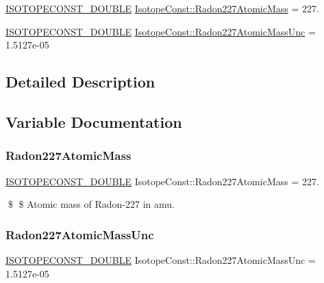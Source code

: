 \begin{DoxyCompactItemize}
\item 
\mbox{\hyperlink{group___isotope_const-_macros_ga8f45a7272ce02c0b4c65c44636ed719a}{I\+S\+O\+T\+O\+P\+E\+C\+O\+N\+S\+T\+\_\+\+D\+O\+U\+B\+LE}} \mbox{\hyperlink{group___isotope_const-_radon-_rn227_ga973813f99c9bd095d65d0279032d362c}{Isotope\+Const\+::\+Radon227\+Atomic\+Mass}} = 227.
\item 
\mbox{\hyperlink{group___isotope_const-_macros_ga8f45a7272ce02c0b4c65c44636ed719a}{I\+S\+O\+T\+O\+P\+E\+C\+O\+N\+S\+T\+\_\+\+D\+O\+U\+B\+LE}} \mbox{\hyperlink{group___isotope_const-_radon-_rn227_ga171e5f8f85390c8c693816c1dfc563f5}{Isotope\+Const\+::\+Radon227\+Atomic\+Mass\+Unc}} = 1.\+5127e-\/05
\end{DoxyCompactItemize}


\subsection{Detailed Description}


\subsection{Variable Documentation}
\mbox{\label{group___isotope_const-_radon-_rn227_ga973813f99c9bd095d65d0279032d362c}} 
\subsubsection{\texorpdfstring{Radon227\+Atomic\+Mass}{Radon227AtomicMass}}
{\footnotesize\ttfamily \mbox{\hyperlink{group___isotope_const-_macros_ga8f45a7272ce02c0b4c65c44636ed719a}{I\+S\+O\+T\+O\+P\+E\+C\+O\+N\+S\+T\+\_\+\+D\+O\+U\+B\+LE}} Isotope\+Const\+::\+Radon227\+Atomic\+Mass = 227.}

\$ \$ Atomic mass of Radon-\/227 in amu. \mbox{\label{group___isotope_const-_radon-_rn227_ga171e5f8f85390c8c693816c1dfc563f5}} 
\subsubsection{\texorpdfstring{Radon227\+Atomic\+Mass\+Unc}{Radon227AtomicMassUnc}}
{\footnotesize\ttfamily \mbox{\hyperlink{group___isotope_const-_macros_ga8f45a7272ce02c0b4c65c44636ed719a}{I\+S\+O\+T\+O\+P\+E\+C\+O\+N\+S\+T\+\_\+\+D\+O\+U\+B\+LE}} Isotope\+Const\+::\+Radon227\+Atomic\+Mass\+Unc = 1.\+5127e-\/05}

